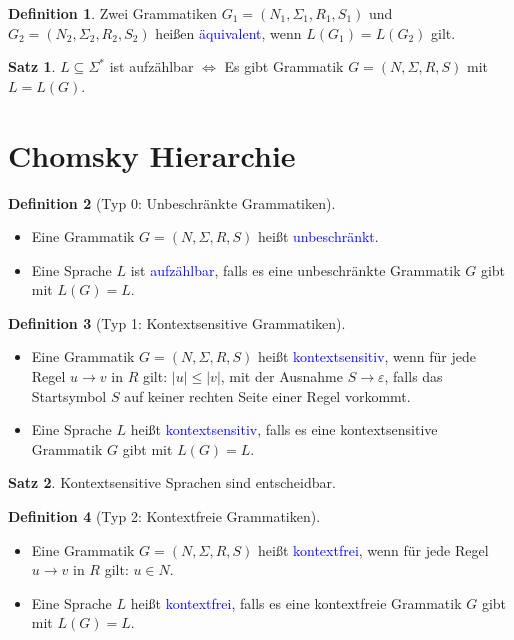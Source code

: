 \documentclass{scrreprt}
\theoremstyle{definition}
\newtheorem{Definition}{Definition}[section]
\newtheorem{Satz}{Satz}[section]
\theoremstyle{example}
\theoremstyle{algorithm}
\begin{document}
\begin{Definition}
Zwei Grammatiken $G_1=(N_1,\Sigma_1,R_1,S_1)$ und $G_2=(N_2,\Sigma_2,R_2,S_2)$ heißen \textcolor{blue}{äquivalent}, wenn $L(G_1)=L(G_2)$ gilt.
\end{Definition}

\begin{Satz}
$L\subseteq\Sigma^*$ ist aufzählbar $\Leftrightarrow$ Es gibt Grammatik $G=(N,\Sigma,R,S)$ mit $L = L(G)$.
\end{Satz}

\section{Chomsky Hierarchie}
\begin{Definition}[Typ 0: Unbeschränkte Grammatiken]
\noindent
\begin{itemize}
\item
Eine Grammatik $G=(N,\Sigma,R,S)$ heißt \textcolor{blue}{unbeschränkt}.
\item
Eine Sprache $L$ ist \textcolor{blue}{aufzählbar}, falls es eine unbeschränkte Grammatik $G$ gibt mit $L(G)=L$.
\end{itemize}
\end{Definition}

\begin{Definition}[Typ 1: Kontextsensitive Grammatiken]
\noindent
\begin{itemize}
\item
Eine Grammatik $G=(N,\Sigma,R,S)$ heißt \textcolor{blue}{kontextsensitiv}, wenn für jede Regel $u\rightarrow v$ in $R$ gilt: $|u| \leq |v|$, mit der Ausnahme $S \rightarrow \varepsilon$, falls das Startsymbol $S$ auf keiner rechten Seite einer Regel vorkommt.
\item
Eine Sprache $L$ heißt \textcolor{blue}{kontextsensitiv}, falls es eine kontextsensitive Grammatik $G$ gibt mit $L(G)=L$.
\end{itemize}
\end{Definition}

\begin{Satz}
Kontextsensitive Sprachen sind entscheidbar.
\end{Satz}

\begin{Definition}[Typ 2: Kontextfreie Grammatiken]
\noindent
\begin{itemize}
\item
Eine Grammatik $G=(N,\Sigma,R,S)$ heißt \textcolor{blue}{kontextfrei}, wenn für jede Regel $u\rightarrow v$ in $R$ gilt: $u \in N$.
\item
Eine Sprache $L$ heißt \textcolor{blue}{kontextfrei}, falls es eine kontextfreie Grammatik $G$ gibt mit $L(G)=L$.
\end{itemize}
\end{Definition}
\end{document}
